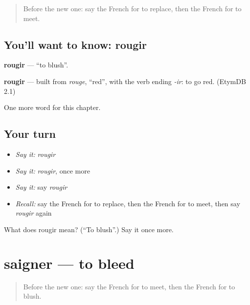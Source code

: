 \label{lesson:FR-C153-rougir}



\begin{quote}
Before the new one: say the French for to replace, then the French for to meet.
\end{quote}

\subsection*{You'll want to know: rougir}
\textbf{rougir} — \textquotedblleft{}to blush\textquotedblright{}.

\begin{cousinweb}
\textbf{rougir} — built from \emph{rouge}, \textquotedblleft{}red\textquotedblright{}, with the verb ending \emph{-ir}: to go red. (EtymDB 2.1)
\end{cousinweb}

\begin{grammarlens}[title={What you've built}]
One more word for this chapter.
\end{grammarlens}

\subsection*{Your turn}
\begin{itemize}
\raggedright
  \item \emph{Say it:} \emph{rougir}
  \item \emph{Say it:} \emph{rougir}, once more
  \item \emph{Say it:} say \emph{rougir}
  \item \emph{Recall:} say the French for to replace, then the French for to meet, then say \emph{rougir} again
\end{itemize}

\begin{tcolorbox}[breakable,colback=teal!4,colframe=teal!35!black,title={Before you move on}]
What does rougir mean? (\textquotedblleft{}To blush\textquotedblright{}.) Say it once more.
\end{tcolorbox}
\section[saigner]{saigner — to bleed}

\label{lesson:FR-C153-saigner}



\begin{quote}
Before the new one: say the French for to meet, then the French for to blush.
\end{quote}

